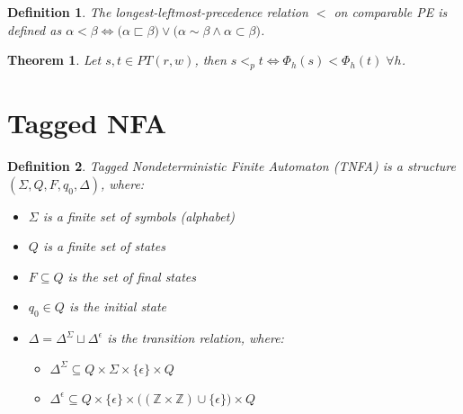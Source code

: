 \documentclass[AMA,STIX1COL]{WileyNJD-v2}
\newcommand{\YZ}{\mathbb{Z}}
\newtheorem{Xdef}{Definition}
\newtheorem{XThe}{Theorem}
\begin{document}
    \begin{Xdef}\label{pe_order}
    The \emph{longest-leftmost-precedence} relation $<$ on comparable PE is defined as
    $\alpha < \beta \Leftrightarrow
        \big( \alpha \sqsubset \beta \big) \vee
        \big( \alpha \sim \beta \wedge \alpha \subset \beta \big)$.
    \end{Xdef}

    \begin{XThe}\label{theorem_order_on_pe_same_as_on_pt}
    Let $s, t \in PT(r, w)$, then
    $s <_p t \Leftrightarrow \Phi_{h}(s) < \Phi_{h}(t) \; \forall h$.
    \end{XThe}

\FloatBarrier


\section{Tagged NFA}

    \begin{Xdef}
    \emph{Tagged Nondeterministic Finite Automaton (TNFA)}
    is a structure $(\Sigma, Q, F, q_0, \Delta)$, where:
    \begin{itemize}
        \item[] $\Sigma$ is a finite set of symbols (\emph{alphabet})
        \item[] $Q$ is a finite set of \emph{states}
        \item[] $F \subseteq Q$ is the set of \emph{final} states
        \item[] $q_0 \in Q$ is the \emph{initial} state

        \item[] $\Delta = \Delta^\Sigma \sqcup \Delta^\epsilon$ is the \emph{transition} relation, where:
        \begin{itemize}
            \item[] $\Delta^\Sigma \subseteq Q \times \Sigma \times \{\epsilon\} \times Q$
            \item[] $\Delta^\epsilon \subseteq Q \times \{\epsilon\} \times \big( (\YZ \times \YZ) \cup \{\epsilon\} \big) \times Q$
        \end{itemize}
    \end{itemize}
    \end{Xdef}
\end{document}
